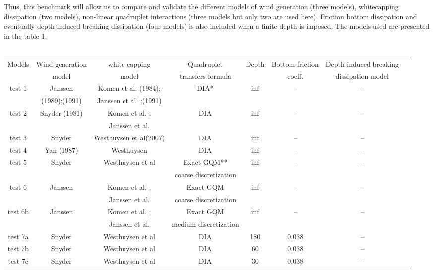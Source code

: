 \documentclass[10pt]{article}
\begin{document}
Thus, this benchmark will allow us to compare and validate the different models
of wind generation (three models), whitecapping dissipation (two models),
non-linear quadruplet interactions (three models but only two are used here).
Friction bottom dissipation and eventually depth-induced breaking dissipation
(four models) is also included when a finite depth is imposed. The models used
are presented in the table 1.\\ \quad \\
\vspace{1cm}
\hspace{-2cm}
\begin{table}
\hspace{-1.54cm}
\begin{tabular}{|c|c|c|c|c|c|c|c|}
\hline
Models & Wind generation  & white capping  & Quadruplet  & Depth &
Bottom friction & Depth-induced breaking \\
&  model &  model &  transfers formula &  &  coeff. &  dissipation
model\\\hline
test 1 & Janssen & Komen et al. (1984);& DIA* & $\inf$ & -- & --\\
 &  (1989);(1991) & Janssen et al.  ;(1991)  & &  &  & \\
\hline
test 2  & Snyder (1981) & Komen et al. ;  & DIA & $\inf$ & --& --\\
 &  & Janssen et al. & &  & &\\
\hline
test 3 & Snyder & Westhuysen et al(2007) & DIA & $\inf$ & --& -- \\
\hline
test 4 & Yan (1987) & Westhuysen & DIA & $\inf$ & --& -- \\
\hline
test 5 & Snyder & Westhuysen et al& Exact GQM**  & $\inf$ & --& --\\
 &  &  &  coarse discretization & & & \\ \hline
 test 6 & Janssen &Komen et al. ;  & Exact GQM  & $\inf$ & -- & --\\
 &  & Janssen et al.  &  coarse discretization & & & \\ \hline
 test 6b & Janssen & Komen et al. ;& Exact GQM & $\inf$ & -- & --\\
  &  & Janssen et al.   &  medium discretization & & & \\ \hline\hline
test 7a & Snyder & Westhuysen et al& DIA & 180 & 0.038 & -- \\
 test 7b & Snyder & Westhuysen et al& DIA & 60 & 0.038& -- \\
 test 7c & Snyder & Westhuysen et al& DIA & 30 & 0.038& -- \\

\end{tabular}
\end{table}
\end{document}
